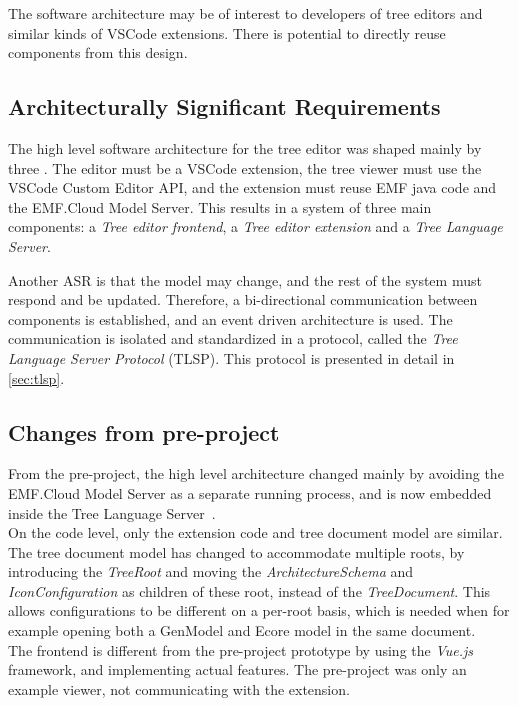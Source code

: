 The software architecture may be of interest to developers of tree editors and similar kinds of \gls{VSCode} extensions.
There is potential to directly reuse components from this design.

\subsection{Architecturally Significant Requirements}
The high level software architecture for the tree editor was shaped mainly by three .
The editor must be a \gls{VSCode} extension, the tree viewer must use the \gls{VSCode} Custom Editor \gls{API}, and the extension must reuse \acrshort{EMF} java code and the EMF.Cloud Model Server.
This results in a system of three main components: a \textit{Tree editor frontend}, a \textit{Tree editor extension} and a \textit{Tree Language Server}.

Another \acrshort{ASR} is that the model may change, and the rest of the system must respond and be updated.
Therefore, a bi-directional communication between components is established, and an event driven architecture is used.
The communication is isolated and standardized in a protocol, called the \textit{Tree Language Server Protocol} (\acrshort{TLSP}).
This protocol is presented in detail in \cref{sec:tlsp}.


\subsection{Changes from pre-project}
From the pre-project, the high level architecture changed mainly by avoiding the EMF.Cloud Model Server as a separate running process, and is now embedded inside the Tree Language Server~\cite[p.~49]{rekstadModelingEnvironmentCloud2020}.\\

On the code level, only the extension code and tree document model are similar.
The tree document model has changed to accommodate multiple roots, by introducing the \textit{TreeRoot} and moving the \textit{ArchitectureSchema} and \textit{IconConfiguration} as children of these root, instead of the \textit{TreeDocument}.
This allows configurations to be different on a per-root basis, which is needed when for example opening both a GenModel and \gls{Ecore} model in the same document.\\

The frontend is different from the pre-project prototype by using the \textit{Vue.js} framework, and implementing actual features.
The pre-project was only an example viewer, not communicating with the extension.\\

